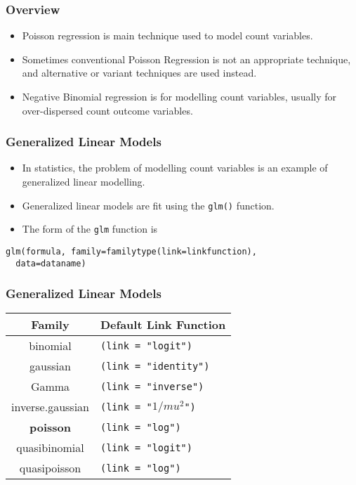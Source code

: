 \documentclass[MASTER.tex]{subfiles}
\begin{document}
\begin{frame}
\frametitle{Overview}
\Large
\begin{itemize}
\item  Poisson regression is main technique used to model count variables.
\item  Sometimes conventional Poisson Regression is not an appropriate technique, and alternative or variant techniques are used instead.
\item  Negative Binomial regression is for modelling count variables, usually for over-dispersed count outcome variables.
\end{itemize}
\end{frame}

\begin{frame}[fragile]
\frametitle{Generalized Linear Models}\large
\begin{itemize}
\item In statistics, the problem of modelling count variables is an example of generalized linear modelling.
\item Generalized linear models are fit using the \texttt{glm()} function. 
\item The form of the \texttt{glm} function is
\end{itemize}
{
\normalsize
\begin{framed}
 \begin{verbatim}
glm(formula, family=familytype(link=linkfunction),
  data=dataname)
\end{verbatim}
\end{framed}
}
\end{frame}
\begin{frame}[fragile]
	\frametitle{Generalized Linear Models}
	\large
\begin{center}
\begin{tabular}{|c|l|} \hline
	Family &	Default Link Function \\ \hline \hline 
	binomial&	\texttt{(link = "logit")} \\ \hline
	gaussian&	\texttt{(link = "identity")} \\ \hline
	Gamma&	\texttt{(link = "inverse")} \\ \hline
	inverse.gaussian&	\texttt{(link = "$1/mu^2$")} \\ \hline
	\textbf{poisson}	&\texttt{(link = "log")} \\ \hline
	quasibinomial&	\texttt{(link = "logit")} \\ \hline
	quasipoisson&	\texttt{(link = "log")} \\ \hline
	
\end{tabular}
\end{center}
 
\end{frame}
\end{document}
